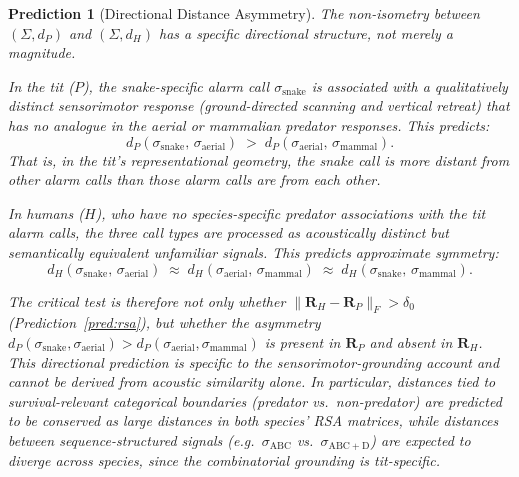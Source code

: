 \documentclass[12pt]{article}
\newtheorem{prediction}{Prediction}
\begin{document}
\begin{prediction}[Directional Distance Asymmetry]
\label{pred:asymmetry}
The non-isometry between $(\Sigma, d_P)$ and $(\Sigma, d_H)$
has a specific directional structure, not merely a magnitude.

In the tit ($P$), the snake-specific alarm call $\sigma_\mathrm{snake}$
is associated with a qualitatively distinct sensorimotor response
(ground-directed scanning and vertical retreat)
that has no analogue in the aerial or mammalian predator responses.
This predicts:
\[
d_P(\sigma_\mathrm{snake},\, \sigma_\mathrm{aerial})
\;>\; d_P(\sigma_\mathrm{aerial},\, \sigma_\mathrm{mammal}).
\]
That is, in the tit's representational geometry, the snake call is
more distant from other alarm calls than those alarm calls
are from each other.

In humans ($H$), who have no species-specific predator associations
with the tit alarm calls, the three call types are processed
as acoustically distinct but semantically equivalent unfamiliar signals.
This predicts approximate symmetry:
\[
d_H(\sigma_\mathrm{snake},\, \sigma_\mathrm{aerial})
\;\approx\; d_H(\sigma_\mathrm{aerial},\, \sigma_\mathrm{mammal})
\;\approx\; d_H(\sigma_\mathrm{snake},\, \sigma_\mathrm{mammal}).
\]

The critical test is therefore not only whether
$\|\mathbf{R}_H - \mathbf{R}_P\|_F > \delta_0$
(Prediction~\ref{pred:rsa}),
but whether the \emph{asymmetry}
$d_P(\sigma_\mathrm{snake}, \sigma_\mathrm{aerial}) > d_P(\sigma_\mathrm{aerial}, \sigma_\mathrm{mammal})$
is present in $\mathbf{R}_P$ and absent in $\mathbf{R}_H$.
This directional prediction is specific to the
sensorimotor-grounding account and cannot be derived
from acoustic similarity alone.
In particular, distances tied to survival-relevant categorical
boundaries (predator vs.\ non-predator) are predicted to be
\emph{conserved} as large distances in both species' RSA matrices,
while distances between sequence-structured signals
(e.g.\ $\sigma_\mathrm{ABC}$ vs.\ $\sigma_\mathrm{ABC+D}$)
are expected to \emph{diverge} across species,
since the combinatorial grounding is tit-specific.
\end{prediction}
\end{document}
